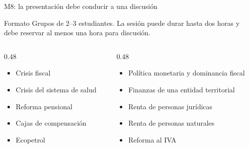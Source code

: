 \begin{frame}{M8: la presentaci\'on debe conducir a una discusi\'on}
\small
\begin{block}{Formato}
  Grupos de 2--3 estudiantes. La sesi\'on puede durar hasta dos horas y debe reservar al menos una hora para discusi\'on.
\end{block}
\begin{columns}[T,onlytextwidth]
  \begin{column}{0.48\textwidth}
    \begin{itemize}
      \item Crisis fiscal
      \item Crisis del sistema de salud
      \item Reforma pensional
      \item Cajas de compensaci\'on
      \item Ecopetrol
    \end{itemize}
  \end{column}
  \begin{column}{0.48\textwidth}
    \begin{itemize}
      \item Pol\'itica monetaria y dominancia fiscal
      \item Finanzas de una entidad territorial
      \item Renta de personas jur\'idicas
      \item Renta de personas naturales
      \item Reforma al IVA
    \end{itemize}
  \end{column}
\end{columns}
\end{frame}

